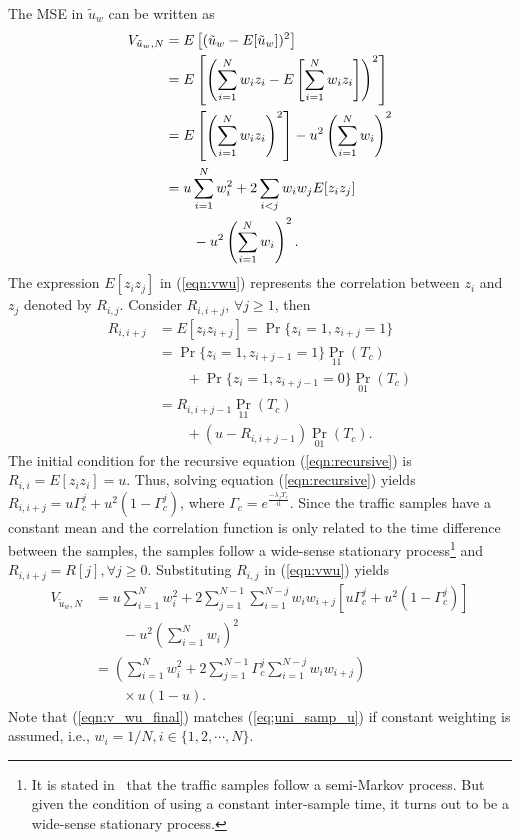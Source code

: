 \documentclass[11pt,draftclsnofoot,journal,onecolumn]{IEEEtran}
\begin{document}
The MSE in $\tilde{u}_w$ can be written as
\begin{align}
V_{\tilde{u}_w,N} & = E\left[(\tilde{u}_w-E[\tilde{u}_w])^2\right]\nonumber\\ & = E\left[\left(\sum\limits_{i=1}^{N}w_{i}z_{i}-E\left[\sum_{i=1}^{N}w_{i}z_{i}\right]\right)^{2}\right] \notag \\ & = E\left[\left(\sum\limits_{i=1}^{N}w_{i}z_{i}\right)^{2}\right]-u^{2}\left(\sum\limits_{i=1}^{N}w_{i}\right)^{2}\nonumber\\ & = u\sum\limits_{i=1}^{N}w_{i}^{2}+2\sum_{i<j}w_{i}w_{j}E[z_{i}z_{j}]\nonumber\\&\qquad-u^{2} \left(\sum\limits_{i=1}^{N}w_{i}\right)^{2}.
\label{eqn:vwu}
\end{align}
The expression $E[z_{i}z_{j}]$ in (\ref{eqn:vwu}) represents the correlation between $z_{i}$ and $z_{j}$ denoted by $R_{i,j}$. Consider $R_{i,i+j}$, $\forall j\geq1$, then
\begin{align}
R_{i,i+j} & = E[z_{i}z_{i+j}] = \Pr\{z_{i}=1, z_{i+j}=1\}\nonumber\\ & = \Pr\{z_{i}=1, z_{i+j-1}=1\}\textstyle\Pr_{11}(T_{c}) \nonumber \\ & \qquad + \Pr\{z_{i}=1, z_{i+j-1}=0\}\textstyle\Pr_{01}(T_{c})\nonumber\\ & = R_{i,i+j-1} \textstyle\Pr_{11}(T_{c})\nonumber\\&\qquad + (u-R_{i,i+j-1}) \textstyle\Pr_{01}(T_{c}).
\label{eqn:recursive}
\end{align}
The initial condition for the recursive equation (\ref{eqn:recursive}) is $R_{i,i}=E[z_{i}z_{i}]=u$. Thus, solving equation (\ref{eqn:recursive}) yields $R_{i,i+j} = u\Gamma_c^{j}+u^{2}(1-\Gamma_c^{j})$, where $\Gamma_c=e^{\frac{-\lambda_f T_c}{u}}$. Since the traffic samples have a constant mean and the correlation function is only related to the time difference between the samples, the samples follow a wide-sense stationary process\footnote{It is stated in~\cite{kim_tmc_2008} that the traffic samples follow a semi-Markov process. But given the condition of using a constant inter-sample time, it turns out to be a wide-sense stationary process.} and $R_{i,i+j} = R[j], \forall j\geq0$. Substituting $R_{i,j}$ in (\ref{eqn:vwu}) yields
\begin{align}
V_{\tilde{u}_w,N} & = u\sum\limits_{i=1}^{N}w_{i}^{2}+2\sum\limits_{j=1}^{N-1}\sum\limits_{i=1}^{N-j}w_{i}w_{i+j}\left[u\Gamma_c^{j}+u^{2}(1-\Gamma_c^{j})\right]\nonumber\\&\qquad - u^{2}\left(\sum\limits_{i=1}^{N}w_{i}\right)^{2} \nonumber \\ & = \left(\sum\limits_{i=1}^{N}w_{i}^{2}+2\sum\limits_{j=1}^{N-1}\Gamma_c^{j}\sum\limits_{i=1}^{N-j}w_{i}w_{i+j}\right)\nonumber\\&\qquad\times u(1-u).
\label{eqn:v_wu_final}
\end{align}
Note that (\ref{eqn:v_wu_final}) matches (\ref{eq;uni_samp_u}) if constant weighting is assumed, i.e., $w_{i}=1/N, i \in\{1,2,\cdots,N\}$.
\end{document}
